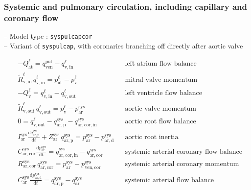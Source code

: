 \documentclass[a4paper,12pt]{report}
\begin{document}
\subsubsection{Systemic and pulmonary circulation, including capillary and coronary flow}

-- Model type : \verb"syspulcapcor"\\

-- Variant of \verb"syspulcap", with coronaries branching off directly after aortic valve

\begin{align}
&-Q_{\mathrm{at}}^{\ell} = q_{\mathrm{ven}}^{\mathrm{pul}} - q_{\mathrm{v,in}}^{\ell} && \text{left atrium flow balance}\nonumber\\
&\tilde{R}_{\mathrm{v,in}}^{\ell}\,q_{\mathrm{v,in}}^{\ell} = p_{\mathrm{at}}^{\ell}-p_{\mathrm{v}}^{\ell} && \text{mitral valve momentum}\nonumber\\
&-Q_{\mathrm{v}}^{\ell} = q_{\mathrm{v,in}}^{\ell} - q_{\mathrm{v,out}}^{\ell} && \text{left ventricle flow balance}\nonumber\\
&\tilde{R}_{\mathrm{v,out}}^{\ell}\,q_{\mathrm{v,out}}^{\ell} = p_{\mathrm{v}}^{\ell}-p_{\mathrm{ar}}^{\mathrm{sys}} && \text{aortic valve momentum}\nonumber\\
&0 = q_{\mathrm{v,out}}^{\ell} - q_{\mathrm{ar,p}}^{\mathrm{sys}} - q_{\mathrm{ar,cor,in}}^{\mathrm{sys}} && \text{aortic root flow balance}\nonumber\\
&I_{\mathrm{ar}}^{\mathrm{sys}} \frac{\mathrm{d}q_{\mathrm{ar,p}}^{\mathrm{sys}}}{\mathrm{d}t} + Z_{\mathrm{ar}}^{\mathrm{sys}}\,q_{\mathrm{ar,p}}^{\mathrm{sys}}=p_{\mathrm{ar}}^{\mathrm{sys}}-p_{\mathrm{ar,d}}^{\mathrm{sys}} && \text{aortic root inertia}\nonumber\\
&C_{\mathrm{ar,cor}}^{\mathrm{sys}} \frac{\mathrm{d}p_{\mathrm{ar}}^{\mathrm{sys}}}{\mathrm{d}t} = q_{\mathrm{ar,cor,in}}^{\mathrm{sys}} - q_{\mathrm{ar,cor}}^{\mathrm{sys}} && \text{systemic arterial coronary flow balance}\nonumber\\
&R_{\mathrm{ar,cor}}^{\mathrm{sys}}\,q_{\mathrm{ar,cor}}^{\mathrm{sys}} = p_{\mathrm{ar}}^{\mathrm{sys}} - p_{\mathrm{ven,cor}}^{\mathrm{sys}} && \text{systemic arterial coronary momentum}\nonumber\\
&C_{\mathrm{ar}}^{\mathrm{sys}} \frac{\mathrm{d}p_{\mathrm{ar,d}}^{\mathrm{sys}}}{\mathrm{d}t} = q_{\mathrm{ar,p}}^{\mathrm{sys}} - q_{\mathrm{ar}}^{\mathrm{sys}}&& \text{systemic arterial flow balance}\nonumber\\

\end{align}
\end{document}
